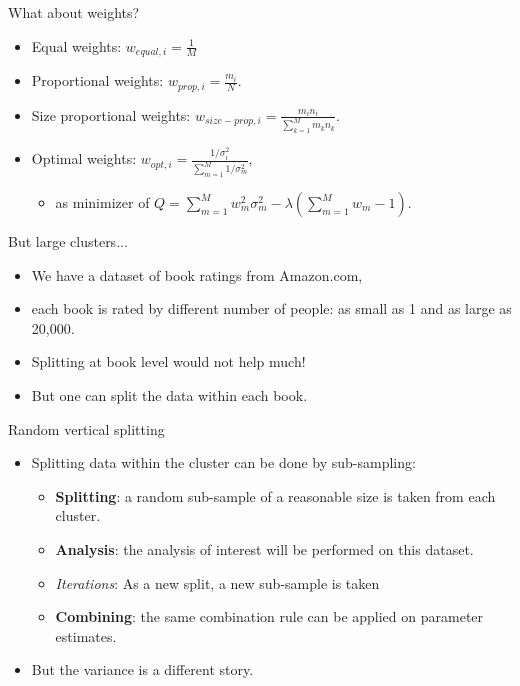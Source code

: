 \documentclass{beamer}
\begin{document}
\begin{frame}{What about weights?}
\begin{itemize}
\item Equal weights: $w_{equal,i} = \frac{1}{M}$
\item Proportional weights: $w_{prop, i} = \frac{m_i}{N}.$
\item Size proportional weights: $w_{size-prop, i} = \frac{m_i n_i}{\sum_{k=1}^ M m_k n_k}.$
\item Optimal weights: $w_{opt, i} = \frac{1/\sigma^2_i}{\sum_{m=1}^M 1/\sigma^2_m},$
\begin{itemize}
\item as minimizer of $Q = \sum_{m=1}^M w_m^2 \sigma_m^2 - \lambda \left(\sum_{m=1}^M w_m -1 \right).$
\end{itemize}
\end{itemize}
\end{frame}

\begin{frame}{But large clusters...}
\begin{itemize}
\item We have a dataset of book ratings from Amazon.com,
\item each book is rated by different number of people: as small as 1 and
as large as 20,000. \pause
\item Splitting at book level would not help much!
\item But one can split the data within each book.
\end{itemize}

\end{frame}

\begin{frame}{Random vertical splitting}

\begin{itemize}
\item Splitting data within the cluster can be done by sub-sampling:
\begin{itemize}
\item \textbf{Splitting}: a random sub-sample of a reasonable size is taken from each cluster.
\item \textbf{Analysis}: the analysis of interest will be performed on this dataset.
\item \textit{Iterations}: As a new split, a new sub-sample is taken
\item \textbf{Combining}: the same combination rule can be applied on parameter estimates. 
\end{itemize}
\item But the variance is a different story.
\end{itemize}

\end{frame}
\end{document}
